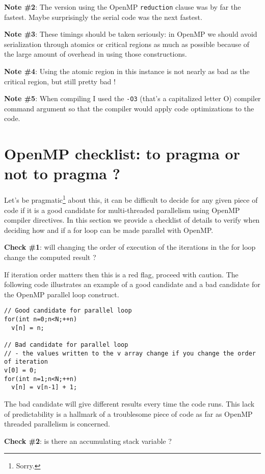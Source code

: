 {\bf Note \#2}: The version using the OpenMP \texttt{reduction} clause was by far the fastest. Maybe surprisingly the serial code was the next fastest. 

{\bf Note \#3}: These timings should be taken seriously: in OpenMP we should avoid serialization through atomics or critical regions as much as possible because of the large amount of overhead in using those constructions.

{\bf Note \#4}: Using the atomic region in this instance is not nearly as bad as the critical region, but still pretty bad !

{\bf Note \#5}: When compiling I used the \texttt{-O3} (that's a capitalized letter O) compiler command argument so that the compiler would apply code optimizations to the code. 

\section{OpenMP checklist: to pragma or not to pragma ?}

Let's be pragmatic\footnote{Sorry.} about this, it can be difficult to decide for any given piece of code if it is a good candidate for multi-threaded parallelism using OpenMP compiler directives. In this section we provide a checklist of details to verify when deciding how and if a for loop can be made parallel with OpenMP.

{\bf Check \#1}: will changing the order of execution of the iterations in the for loop change the computed result ? 

If iteration order matters then this is a red flag, proceed with caution. The following code illustrates an example of a good candidate and a bad candidate for the OpenMP parallel loop construct.

\begin{verbatim}
// Good candidate for parallel loop
for(int n=0;n<N;++n) 
  v[n] = n;

// Bad candidate for parallel loop 
// - the values written to the v array change if you change the order of iteration
v[0] = 0;
for(int n=1;n<N;++n) 
  v[n] = v[n-1] + 1;
\end{verbatim}

The bad candidate will give different results every time the code runs. This lack of predictability is a hallmark of a troublesome piece of code as far as OpenMP threaded parallelism is concerned.

{\bf Check \#2}: is there an accumulating stack variable ? 

